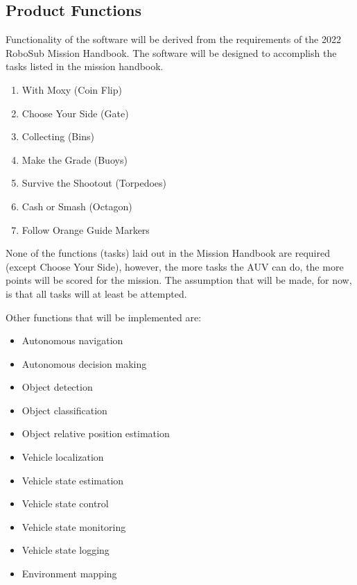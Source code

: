 \subsection{Product Functions}
\label{sec:functions}

Functionality of the software will be derived from the requirements of the
2022 RoboSub Mission Handbook. The software will be designed to accomplish the
tasks listed in the mission handbook.

\begin{enumerate}
    \item With Moxy (Coin Flip) 
    \item Choose Your Side (Gate) 
    \item Collecting (Bins) 
    \item Make the Grade (Buoys) 
    \item Survive the Shootout (Torpedoes) 
    \item Cash or Smash (Octagon) 
    \item Follow Orange Guide Markers
\end{enumerate}

None of the functions (tasks) laid out in the Mission Handbook are required
(except Choose Your Side), however, the more tasks the AUV can do, the more
points will be scored for the mission. The assumption that will be made, for
now, is that all tasks will at least be attempted.
\par

Other functions that will be implemented are:
\begin{itemize}
    \item Autonomous navigation
    \item Autonomous decision making
    \item Object detection
    \item Object classification
    \item Object relative position estimation
    \item Vehicle localization
    \item Vehicle state estimation
    \item Vehicle state control
    \item Vehicle state monitoring
    \item Vehicle state logging
    \item Environment mapping
\end{itemize}

